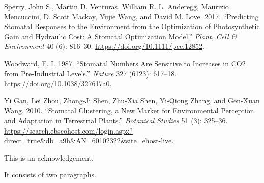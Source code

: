\documentclass[12pt,halfline,a4paper,]{ouparticle}
\newlength{\cslhangindent}
\newlength{\cslentryspacingunit} %
\newenvironment{CSLReferences}[2] %
 {%
  \setlength{\parindent}{0pt}
  \ifodd #1
  \let\oldpar\par
  \def\par{\hangindent=\cslhangindent\oldpar}
  \fi
  \setlength{\parskip}{#2\cslentryspacingunit}
 }%
 {}
\begin{document}
\begin{CSLReferences}{1}{0}
\leavevmode{}%
Sperry, John S., Martin D. Venturas, William R. L. Anderegg, Maurizio
Mencuccini, D. Scott Mackay, Yujie Wang, and David M. Love. 2017.
{``Predicting Stomatal Responses to the Environment from the
Optimization of Photosynthetic Gain and Hydraulic Cost: {A} Stomatal
Optimization Model.''} \emph{Plant, Cell \& Environment} 40 (6):
816--30. \url{https://doi.org/10.1111/pce.12852}.

\leavevmode{}%
Woodward, F. I. 1987. {``Stomatal Numbers Are Sensitive to Increases in
{CO2} from Pre-Industrial Levels.''} \emph{Nature} 327 (6123): 617--18.
\url{https://doi.org/10.1038/327617a0}.

\leavevmode{}%
Yi Gan, Lei Zhou, Zhong-Ji Shen, Zhu-Xia Shen, Yi-Qiong Zhang, and
Gen-Xuan Wang. 2010. {``Stomatal Clustering, a New Marker for
Environmental Perception and Adaptation in Terrestrial Plants.''}
\emph{Botanical Studies} 51 (3): 325--36.
\url{https://search.ebscohost.com/login.aspx?direct=true\&db=a9h\&AN=60102322\&site=ehost-live}.

\end{CSLReferences}


\begin{notes}[Acknowledgements]
This is an acknowledgement.

It consists of two paragraphs.
\end{notes}
\end{document}
